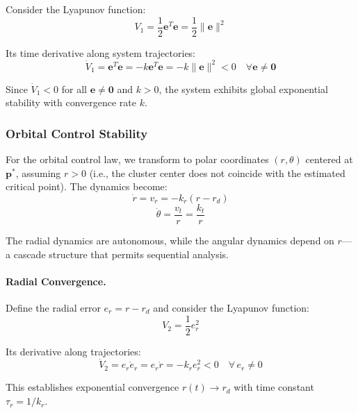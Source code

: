 \documentclass[lettersize,journal]{IEEEtran}
\begin{document}
Consider the Lyapunov function:
\begin{equation}
V_1 = \frac{1}{2}\mathbf{e}^T\mathbf{e} = \frac{1}{2}\|\mathbf{e}\|^2
\end{equation}

Its time derivative along system trajectories:
\begin{equation}
\dot{V}_1 = \mathbf{e}^T\dot{\mathbf{e}} = -k\mathbf{e}^T\mathbf{e} = -k\|\mathbf{e}\|^2 < 0 \quad \forall \mathbf{e} \neq \mathbf{0}
\end{equation}

Since $\dot{V}_1 < 0$ for all $\mathbf{e} \neq \mathbf{0}$ and $k > 0$, the system exhibits global exponential stability with convergence rate $k$.

\subsubsection{Orbital Control Stability}

For the orbital control law, we transform to polar coordinates $(r, \theta)$ centered at $\mathbf{p}^*$, assuming $r > 0$ (i.e., the cluster center does not coincide with the estimated critical point). The dynamics become:
\begin{equation}
\dot{r} = v_r = -k_r(r - r_d)
\end{equation}
\begin{equation}
\dot{\theta} = \frac{v_t}{r} = \frac{k_t}{r}
\end{equation}

The radial dynamics are autonomous, while the angular dynamics depend on $r$---a cascade structure that permits sequential analysis.

\paragraph{Radial Convergence.}
Define the radial error $e_r = r - r_d$ and consider the Lyapunov function:
\begin{equation}
V_2 = \frac{1}{2}e_r^2
\end{equation}

Its derivative along trajectories:
\begin{equation}
\dot{V}_2 = e_r \dot{e}_r = e_r \dot{r} = -k_r e_r^2 < 0 \quad \forall\, e_r \neq 0
\end{equation}

This establishes exponential convergence $r(t) \to r_d$ with time constant $\tau_r = 1/k_r$.
\end{document}
